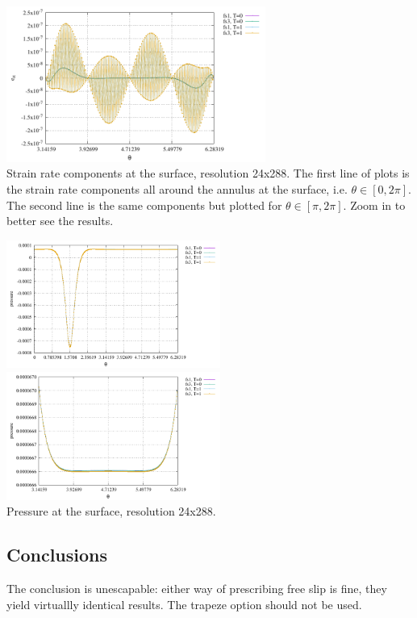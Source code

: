\begin{center}
\includegraphics[width=8.5cm]{python_codes/fieldstone_151/results/test5/e_rt2}\\
{\captionfont Strain rate components at the surface, resolution 24x288. 
The first line of plots is the strain rate components all around the annulus at the surface, i.e.
$\theta\in[0,2\pi]$. The second line is the same components but plotted for $\theta\in[\pi,2\pi]$.
Zoom in to better see the results.}
\end{center}


\begin{center}
\includegraphics[width=7cm]{python_codes/fieldstone_151/results/test5/p}
\includegraphics[width=7cm]{python_codes/fieldstone_151/results/test5/p2}\\
{\captionfont Pressure at the surface, resolution 24x288.}
\end{center}


\subsection*{Conclusions}

The conclusion is unescapable: either way of prescribing free slip is fine, they yield 
virtuallly identical results. The trapeze option should not be used.  


